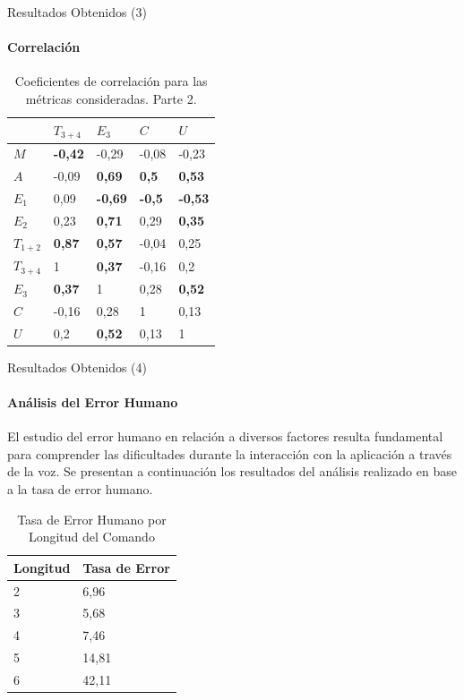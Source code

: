 \begin{frame}{Resultados Obtenidos (3)}
\framesubtitle{Correlaci\'on}
\begin{table}[H] 
\centering
\tiny
\caption{Coeficientes de correlaci\'on para las m\'etricas consideradas. Parte 2.}
\begin{tabular}{|p{0.6cm}|p{0.6cm}|p{0.6cm}|p{0.6cm}|p{0.6cm}|}
\hline
&           $T_{3+4}$     & $E_3$ & $C$                        & $U$ \\
\hline
$M$         &  \textbf{-0,42}  &  -0,29  &  -0,08              &  -0,23 \\
$A$         &  -0,09  &  \textbf{0,69}  &  \textbf{0,5}        &  \textbf{0,53} \\
$E_1$       &  0,09  &  \textbf{-0,69}  &  \textbf{-0,5}       &  \textbf{-0,53} \\
$E_2$       &  0,23  &  \textbf{0,71}  &  0,29                 &  \textbf{0,35}  \\
$T_{1+2}$   &  \textbf{0,87}  &  \textbf{0,57}  &  -0,04       &  0,25 \\
$T_{3+4}$   &  1  &  \textbf{0,37}  &  -0,16                   &  0,2 \\
$E_3$       &  \textbf{0,37}  &  1  &  0,28                    &  \textbf{0,52} \\
$C$         &  -0,16  &  0,28  &  1                            &  0,13 \\
$U$         &  0,2  &  \textbf{0,52}  &  0,13                  &  1 \\
\hline
\end{tabular}
\label{sec:tabla-correlacion-2}
\end{table}
\end{frame}

\begin{frame}{Resultados Obtenidos (4)}
\framesubtitle{An\'alisis del Error Humano}
El estudio del error humano en relaci\'on a diversos factores resulta fundamental para comprender
las dificultades durante la interacci\'on con la aplicaci\'on a trav\'es de la voz.
Se presentan a continuaci\'on los resultados del an\'alisis realizado en base a la tasa de error humano.

\begin{table}[H]
\centering
\tiny
\caption{Tasa de Error Humano por Longitud del Comando}
\begin{tabular}{|p{1.5cm}|p{1.5cm}|}
\hline
    Longitud & Tasa de Error \\
    \hline
    2 & 6,96 \\
    3 & 5,68 \\
    4 & 7,46 \\
    5 & 14,81 \\
    6 & 42,11 \\
\hline
\end{tabular}
\label{sec:error-longitud}
\end{table}
\end{frame}

